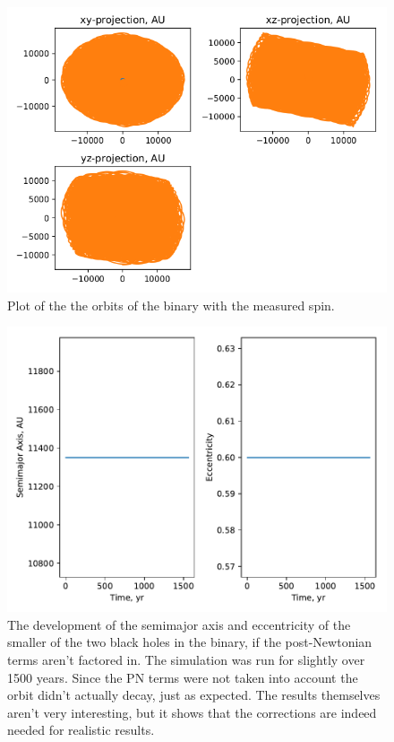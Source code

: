 \documentclass[english, oneside]{HYgradu}
\begin{document}
\begin{figure}[h!tb]
\centering
\includegraphics[width=\textwidth]{../images/spinNormalOrbits.png}
\caption{Plot of the the orbits of the binary with the measured spin.}
\label{fig:spinNormalOrbits}
\end{figure}

\begin{figure}[h!tb]
\centering
\includegraphics[width=\textwidth]{../images/noPN.pdf}
\caption{The development of the semimajor axis and eccentricity of the smaller of the two black holes in the binary, if the post-Newtonian terms aren't factored in. The simulation was run for slightly over 1500 years. Since the PN terms were not taken into account the orbit didn't actually decay, just as expected. The results themselves aren't very interesting, but it shows that the corrections are indeed needed for realistic results.}
\label{fig:noPN}
\end{figure}
\end{document}
